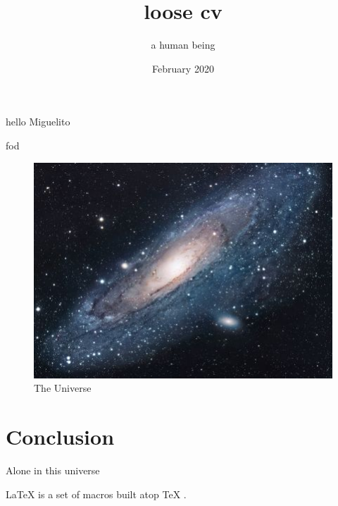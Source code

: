 \documentclass{article}
\title{loose cv}
\author{a human being }
\date{February 2020}
\begin{document}
hello Miguelito

fod


\maketitle


\begin{figure}[h!]
\centering
\includegraphics[scale=1.7]{universe}
\caption{The Universe}
\label{fig:universe}
\end{figure}

\section{Conclusion}
Alone in this universe


\LaTeX{} \cite{latex2e} is a set of macros built atop \TeX{} \cite{texbook}.
\end{document}
